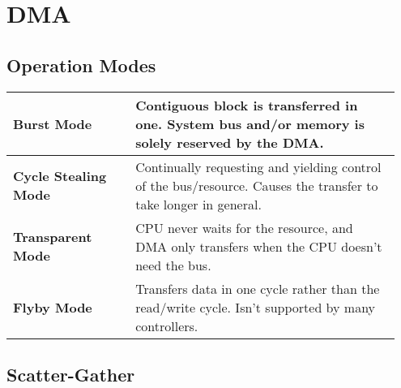 \section{DMA }
	\subsection{Operation Modes}
			\begin{longtable}{|p{0.3\linewidth}|p{0.65\linewidth}|}
				\hline
				\textbf{Burst Mode}
					& Contiguous block is transferred in one. System bus and/or memory is solely reserved by the DMA.\\
				\hline
				\textbf{Cycle Stealing Mode}
					& Continually requesting and yielding control of the bus/resource. Causes the transfer to take longer in general.\\
				\hline
				\textbf{Transparent Mode}
					& CPU never waits for the resource, and DMA only transfers when the CPU doesn't need the bus.\\
				\hline	
				\textbf{Flyby Mode}
					& Transfers data in one cycle rather than the read/write cycle. Isn't supported by many controllers.\\
				\hline
			\end{longtable}
	\subsection{Scatter-Gather}
